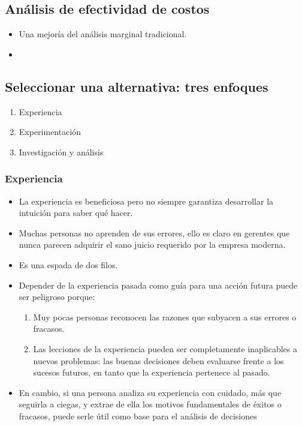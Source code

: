 \documentclass{article}
\begin{document}
\subsection{Análisis de efectividad de costos}
\begin{itemize}
    \item Una mejoría del análisis marginal tradicional.
    \item {} 
\end{itemize}


\subsection{Seleccionar una alternativa: tres enfoques}
\begin{enumerate}
    \item Experiencia 
    \item Experimentación 
    \item Investigación y análisis
\end{enumerate}

\subsubsection{Experiencia}
\begin{itemize}
    \item La experiencia es beneficiosa pero no siempre garantiza desarrollar la intuición para saber qué hacer.
    \item Muchas personas no aprenden de sus errores, ello es claro en gerentes que nunca parecen adquirir el sano juicio requerido por la empresa moderna.
    \item Es una espada de dos filos.
    \item Depender de la experiencia pasada como guía para una acción futura puede ser peligroso porque:
        \begin{enumerate}
            \item  Muy pocas personas reconocen las razones que subyacen a sus errores o fracasos. 
            \item Las lecciones de la experiencia pueden ser completamente inaplicables a nuevos problemas: las buenas decisiones deben evaluarse frente a los sucesos futuros, en tanto que la experiencia pertenece al pasado.
        \end{enumerate}
    
    \item En cambio, si una persona analiza su experiencia con cuidado, más que seguirla a ciegas, y extrae de ella los motivos fundamentales de éxitos o fracasos, puede serle útil como base para el análisis de decisiones
\end{itemize}
\end{document}
